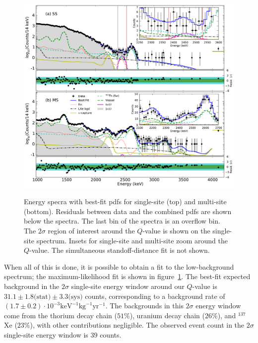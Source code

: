 \begin{figure}
\begin{center}
\includegraphics[keepaspectratio=true,width=\textwidth]{Energy_BestFit_frompaper.pdf}
\end{center}
\renewcommand{\baselinestretch}{1}
\small\normalsize
\begin{quote}
\caption{Energy specra with best-fit pdfs for single-site (top) and multi-site (bottom).  Residuals between data and the combined pdfs are shown below the spectra.  The last bin of the spectra is an overflow bin.  The $2\sigma$ region of interest around the $Q$-value is shown on the single-site spectrum.  Insets for single-site and multi-site zoom around the $Q$-value.  The simultaneous standoff-distance fit is not shown.~\cite{NewEXObb0nPaper_2014}}
\label{fig:BestFitEnergyFromPaper}
\end{quote}
\end{figure}
\renewcommand{\baselinestretch}{2}
\small\normalsize

When all of this is done, it is possible to obtain a fit to the low-background spectrum; the maximum-likelihood fit is shown in figure~\ref{fig:BestFitEnergyFromPaper}.  The best-fit expected background in the $2\sigma$ single-site energy window around our $Q$-value is $31.1 \pm 1.8\text{(stat)} \pm 3.3\text{(sys)}$ counts, corresponding to a background rate of $(1.7 \pm 0.2)\cdot 10^{-3} \text{keV}^{-1} \text{kg}^{−1} \text{yr}^{−1}$.  The backgrounds in this $2\sigma$ energy window come from the thorium decay chain ($51\%$), uranium decay chain ($26\%$), and $^{137}$Xe ($23\%$), with other contributions negligible.  The observed event count in the $2\sigma$ single-site energy window is $39$ counts.~\cite{NewEXObb0nPaper_2014}

